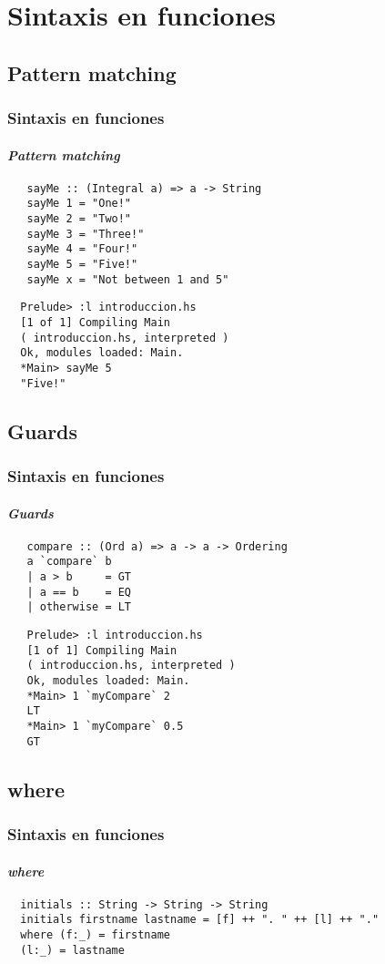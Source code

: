 \section{Sintaxis en funciones}
\subsection{Pattern matching}
\begin{frame}[fragile]
  \frametitle{Sintaxis en funciones}
  \framesubtitle{\emph{Pattern matching}}
  {\color{white}
    \begin{verbatim}
   sayMe :: (Integral a) => a -> String
   sayMe 1 = "One!"
   sayMe 2 = "Two!"
   sayMe 3 = "Three!"
   sayMe 4 = "Four!"
   sayMe 5 = "Five!"
   sayMe x = "Not between 1 and 5"
    \end{verbatim}
  }

  {\color{white}
    \begin{verbatim}
  Prelude> :l introduccion.hs
  [1 of 1] Compiling Main
  ( introduccion.hs, interpreted )
  Ok, modules loaded: Main.
  *Main> sayMe 5
  "Five!"
    \end{verbatim}
  }
\end{frame}

\subsection{Guards}
\begin{frame}[fragile]
  \frametitle{Sintaxis en funciones}
  \framesubtitle{\emph{Guards}}
  {\color{white}
    \begin{verbatim}
   compare :: (Ord a) => a -> a -> Ordering
   a `compare` b
   | a > b     = GT
   | a == b    = EQ
   | otherwise = LT
    \end{verbatim}
  }
  {\color{white}
    \begin{verbatim}
   Prelude> :l introduccion.hs
   [1 of 1] Compiling Main
   ( introduccion.hs, interpreted )
   Ok, modules loaded: Main.
   *Main> 1 `myCompare` 2
   LT
   *Main> 1 `myCompare` 0.5
   GT
    \end{verbatim}
  }
\end{frame}

\subsection{where}
\begin{frame}[fragile]
  \frametitle{Sintaxis en funciones}
  \framesubtitle{\emph{where}}
  {\color{white}
    \begin{verbatim}
  initials :: String -> String -> String
  initials firstname lastname = [f] ++ ". " ++ [l] ++ "."
  where (f:_) = firstname
  (l:_) = lastname
    \end{verbatim}
  }
\end{frame}
